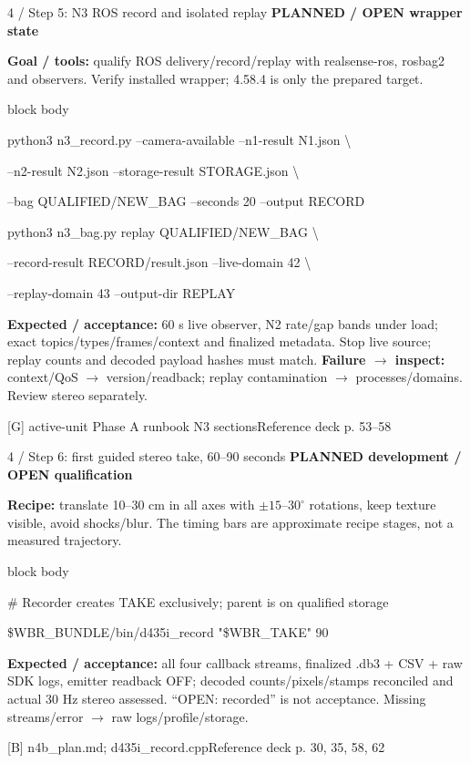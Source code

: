 \documentclass[aspectratio=169,12pt,t]{beamer}
\newcommand{\evidence}[1]{{\small\bfseries\color{teal!70!black}#1}\par\medskip}
\newcommand{\src}[2]{\vfill\par{\footnotesize\color{muted}#1\quad Reference deck p. #2}\par}
\newcommand{\code}[1]{\par\smallskip\begin{beamercolorbox}[wd=\linewidth,sep=2mm]{block body}{\ttfamily\small #1}\end{beamercolorbox}\par\smallskip}
\begin{document}
\begin{frame}{4 / Step 5: N3 ROS record and isolated replay}
\evidence{PLANNED / OPEN wrapper state}

\textbf{Goal / tools:} qualify ROS delivery/record/replay with realsense-ros, rosbag2 and observers. Verify installed wrapper; 4.58.4 is only the prepared target.
\code{python3 n3\_record.py --camera-available --n1-result N1.json \textbackslash{}\par \quad --n2-result N2.json --storage-result STORAGE.json \textbackslash{}\par \quad --bag QUALIFIED/NEW\_BAG --seconds 20 --output RECORD\par python3 n3\_bag.py replay QUALIFIED/NEW\_BAG \textbackslash{}\par \quad --record-result RECORD/result.json --live-domain 42 \textbackslash{}\par \quad --replay-domain 43 --output-dir REPLAY}
\medskip \textbf{Expected / acceptance:} 60 s live observer, N2 rate/gap bands under load; exact topics/types/frames/context and finalized metadata. Stop live source; replay counts and decoded payload hashes must match.
\medskip \textbf{Failure $\to$ inspect:} context/QoS $\to$ version/readback; replay contamination $\to$ processes/domains. Review stereo separately.

\src{[G] active-unit Phase A runbook N3 sections}{53--58}
\end{frame}

\begin{frame}{4 / Step 6: first guided stereo take, 60--90 seconds}
\evidence{PLANNED development / OPEN qualification}

\begin{center}\end{center}
\medskip \textbf{Recipe:} translate 10--30 cm in all axes with $\pm15$--$30^\circ$ rotations, keep texture visible, avoid shocks/blur. The timing bars are approximate recipe stages, not a measured trajectory.
\code{\# Recorder creates TAKE exclusively; parent is on qualified storage\par \$WBR\_BUNDLE/bin/d435i\_record "\$WBR\_TAKE" 90}
\medskip \textbf{Expected / acceptance:} all four callback streams, finalized .db3 + CSV + raw SDK logs, emitter readback OFF; decoded counts/pixels/stamps reconciled and actual 30 Hz stereo assessed. ``OPEN: recorded'' is not acceptance. Missing streams/error $\to$ raw logs/profile/storage.

\src{[B] n4b\_plan.md; d435i\_record.cpp}{30, 35, 58, 62}
\end{frame}
\end{document}
